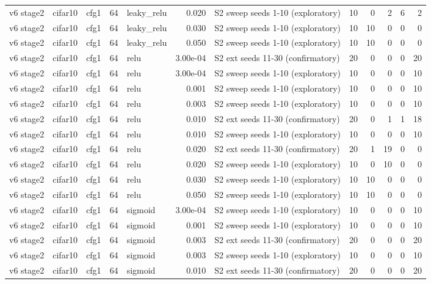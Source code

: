 \begin{table}[htbp]
{\begin{tabular}{@{}lllrlrlrrrrr@{}}
v6 stage2 & cifar10 & cfg1 & 64 & leaky\_relu & 0.020 & S2 sweep seeds 1-10 (exploratory) & 10 & 0 & 2 & 6 & 2 \\
v6 stage2 & cifar10 & cfg1 & 64 & leaky\_relu & 0.030 & S2 sweep seeds 1-10 (exploratory) & 10 & 10 & 0 & 0 & 0 \\
v6 stage2 & cifar10 & cfg1 & 64 & leaky\_relu & 0.050 & S2 sweep seeds 1-10 (exploratory) & 10 & 10 & 0 & 0 & 0 \\
v6 stage2 & cifar10 & cfg1 & 64 & relu & 3.00e-04 & S2 ext seeds 11-30 (confirmatory) & 20 & 0 & 0 & 0 & 20 \\
v6 stage2 & cifar10 & cfg1 & 64 & relu & 3.00e-04 & S2 sweep seeds 1-10 (exploratory) & 10 & 0 & 0 & 0 & 10 \\
v6 stage2 & cifar10 & cfg1 & 64 & relu & 0.001 & S2 sweep seeds 1-10 (exploratory) & 10 & 0 & 0 & 0 & 10 \\
v6 stage2 & cifar10 & cfg1 & 64 & relu & 0.003 & S2 sweep seeds 1-10 (exploratory) & 10 & 0 & 0 & 0 & 10 \\
v6 stage2 & cifar10 & cfg1 & 64 & relu & 0.010 & S2 ext seeds 11-30 (confirmatory) & 20 & 0 & 1 & 1 & 18 \\
v6 stage2 & cifar10 & cfg1 & 64 & relu & 0.010 & S2 sweep seeds 1-10 (exploratory) & 10 & 0 & 0 & 0 & 10 \\
v6 stage2 & cifar10 & cfg1 & 64 & relu & 0.020 & S2 ext seeds 11-30 (confirmatory) & 20 & 1 & 19 & 0 & 0 \\
v6 stage2 & cifar10 & cfg1 & 64 & relu & 0.020 & S2 sweep seeds 1-10 (exploratory) & 10 & 0 & 10 & 0 & 0 \\
v6 stage2 & cifar10 & cfg1 & 64 & relu & 0.030 & S2 sweep seeds 1-10 (exploratory) & 10 & 10 & 0 & 0 & 0 \\
v6 stage2 & cifar10 & cfg1 & 64 & relu & 0.050 & S2 sweep seeds 1-10 (exploratory) & 10 & 10 & 0 & 0 & 0 \\
v6 stage2 & cifar10 & cfg1 & 64 & sigmoid & 3.00e-04 & S2 sweep seeds 1-10 (exploratory) & 10 & 0 & 0 & 0 & 10 \\
v6 stage2 & cifar10 & cfg1 & 64 & sigmoid & 0.001 & S2 sweep seeds 1-10 (exploratory) & 10 & 0 & 0 & 0 & 10 \\
v6 stage2 & cifar10 & cfg1 & 64 & sigmoid & 0.003 & S2 ext seeds 11-30 (confirmatory) & 20 & 0 & 0 & 0 & 20 \\
v6 stage2 & cifar10 & cfg1 & 64 & sigmoid & 0.003 & S2 sweep seeds 1-10 (exploratory) & 10 & 0 & 0 & 0 & 10 \\
v6 stage2 & cifar10 & cfg1 & 64 & sigmoid & 0.010 & S2 ext seeds 11-30 (confirmatory) & 20 & 0 & 0 & 0 & 20 \\

\end{tabular}}
\end{table}
